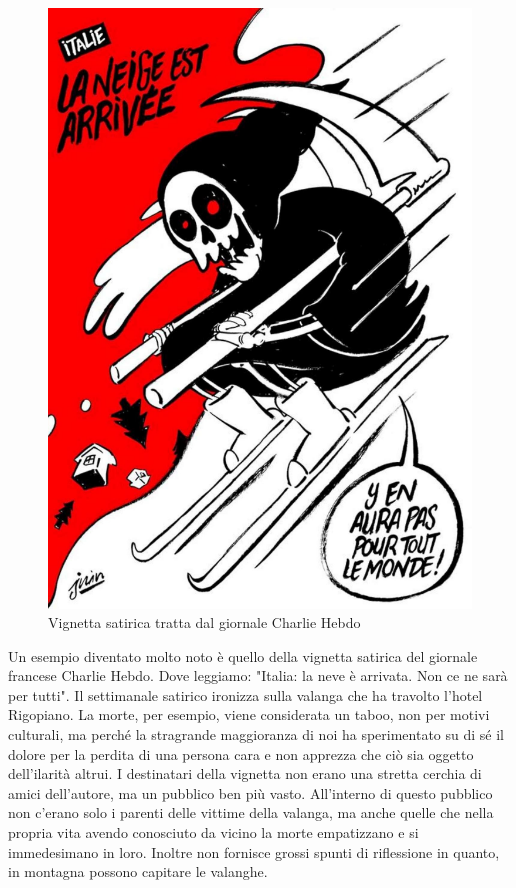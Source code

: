 \documentclass[12pt]{book} %
\begin{document}
\begin{mdframed}[linewidth=1pt]
\needspace{4cm}
\begin{figure}
  \centering
  \includegraphics[width=0.95\linewidth]{images/Libro-img032.jpg}
  \begin{minipage}{\linewidth}
    \caption{Vignetta satirica tratta dal giornale Charlie Hebdo}
  \end{minipage}
\end{figure}

Un esempio diventato molto noto è quello della vignetta satirica del giornale francese Charlie Hebdo. Dove
leggiamo: "Italia: la neve è arrivata. Non ce ne sarà per tutti". Il settimanale satirico
ironizza sulla valanga che ha travolto l'hotel Rigopiano. La morte, per esempio, viene considerata un taboo,
non per motivi culturali, ma perché la stragrande maggioranza di noi ha sperimentato su di sé il dolore per la perdita
di una persona cara e non apprezza che ciò sia oggetto dell'ilarità altrui. I destinatari della
vignetta non erano una stretta cerchia di amici dell'autore, ma un pubblico ben più vasto.
All'interno di questo pubblico non c'erano solo i parenti delle vittime della
valanga, ma anche quelle che nella propria vita avendo conosciuto da vicino la morte empatizzano e si immedesimano in
loro. Inoltre non fornisce grossi spunti di riflessione in quanto, in montagna possono capitare le valanghe.


\end{mdframed}
\end{document}
